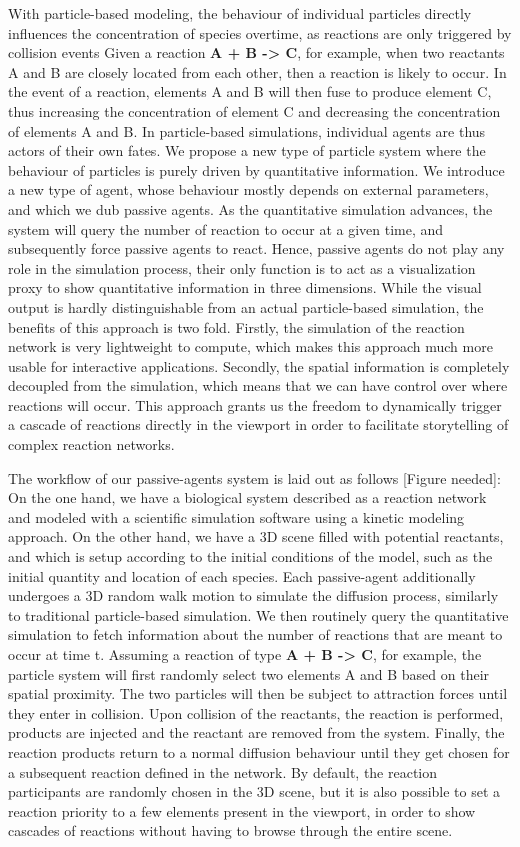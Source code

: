 With particle-based modeling, the behaviour of individual particles directly influences the concentration of species overtime, as reactions are only triggered by collision events
Given a reaction \textbf{A + B -> C}, for example, when two reactants A and B are closely located from each other, then a reaction is likely to occur.
In the event of a reaction, elements A and B will then fuse to produce element C, thus increasing the concentration of element C and decreasing the concentration of elements A and B.
In particle-based simulations, individual agents are thus actors of their own fates.
We propose a new type of particle system where the behaviour of particles is purely driven by quantitative information.
We introduce a new type of agent, whose behaviour mostly depends on external parameters, and which we dub passive agents.
As the quantitative simulation advances, the system will query the number of reaction to occur at a given time, and subsequently force passive agents to react.
Hence, passive agents do not play any role in the simulation process, their only function is to act as a visualization proxy to show quantitative information in three dimensions.
While the visual output is hardly distinguishable from an actual particle-based simulation, the benefits of this approach is two fold.
Firstly, the simulation of the reaction network is very lightweight to compute, which makes this approach much more usable for interactive applications.
Secondly, the spatial information is completely decoupled from the simulation, which means that we can have control over where reactions will occur.
This approach grants us the freedom to dynamically trigger a cascade of reactions directly in the viewport in order to facilitate storytelling of complex reaction networks.

The workflow of our passive-agents system is laid out as follows [Figure needed]:
On the one hand, we have a biological system described as a reaction network and modeled with a scientific simulation software using a kinetic modeling approach.
On the other hand, we have a 3D scene filled with potential reactants, and which is setup according to the initial conditions of the model, such as the initial quantity and location of each species.
Each passive-agent additionally undergoes a 3D random walk motion to simulate the diffusion process, similarly to traditional particle-based simulation.
We then routinely query the quantitative simulation to fetch information about the number of reactions that are meant to occur at time t.
Assuming a reaction of type \textbf{A + B -> C}, for example, the particle system will first randomly select two elements A and B based on their spatial proximity.
The two particles will then be subject to attraction forces until they enter in collision.
Upon collision of the reactants, the reaction is performed, products are injected and the reactant are removed from the system.
Finally, the reaction products return to a normal diffusion behaviour until they get chosen for a subsequent reaction defined in the network.
By default, the reaction participants are randomly chosen in the 3D scene, but it is also possible to set a reaction priority to a few elements present in the viewport, in order to show cascades of reactions without having to browse through the entire scene.

